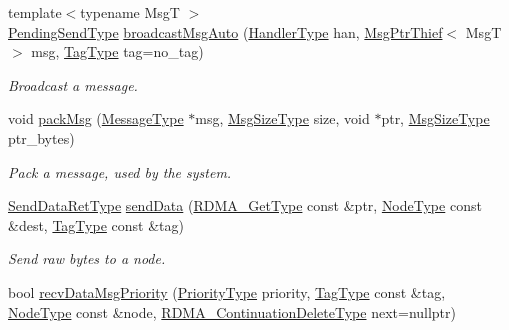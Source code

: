 \begin{DoxyCompactItemize}
{\footnotesize template$<$typename MsgT $>$ }\\\hyperlink{structvt_1_1messaging_1_1_active_messenger_a3626a6ca76d8ad4ec7c3b47a2c70d3a8}{Pending\+Send\+Type} \hyperlink{group__sendpayload_gab11ebaa792d7b87397773347626ad4f9}{broadcast\+Msg\+Auto} (\hyperlink{namespacevt_af64846b57dfcaf104da3ef6967917573}{Handler\+Type} han, \hyperlink{structvt_1_1messaging_1_1_msg_ptr_thief}{Msg\+Ptr\+Thief}$<$ MsgT $>$ msg, \hyperlink{namespacevt_a84ab281dae04a52a4b243d6bf62d0e52}{Tag\+Type} tag=no\+\_\+tag)
\begin{DoxyCompactList}\small\item\em Broadcast a message. \end{DoxyCompactList}\item 
void \hyperlink{structvt_1_1messaging_1_1_active_messenger_a9799bd2681540170faa04b424d3c849e}{pack\+Msg} (\hyperlink{structvt_1_1messaging_1_1_active_messenger_a720a2b1e7462d414b2a51d9fe005eca9}{Message\+Type} $\ast$msg, \hyperlink{namespacevt_abfa009d900299ac1df967b40ea8f2c8a}{Msg\+Size\+Type} size, void $\ast$ptr, \hyperlink{namespacevt_abfa009d900299ac1df967b40ea8f2c8a}{Msg\+Size\+Type} ptr\+\_\+bytes)
\begin{DoxyCompactList}\small\item\em Pack a message, used by the system. \end{DoxyCompactList}\item 
\hyperlink{structvt_1_1messaging_1_1_active_messenger_a839987e944b6b9c681bc56efbea1f220}{Send\+Data\+Ret\+Type} \hyperlink{structvt_1_1messaging_1_1_active_messenger_ac4385fea0c9cc860b5af24fea2f89a1d}{send\+Data} (\hyperlink{namespacevt_a1cab7f4860f65a49ad2c042d6240f288}{R\+D\+M\+A\+\_\+\+Get\+Type} const \&ptr, \hyperlink{namespacevt_a866da9d0efc19c0a1ce79e9e492f47e2}{Node\+Type} const \&dest, \hyperlink{namespacevt_a84ab281dae04a52a4b243d6bf62d0e52}{Tag\+Type} const \&tag)
\begin{DoxyCompactList}\small\item\em Send raw bytes to a node. \end{DoxyCompactList}\item 
bool \hyperlink{structvt_1_1messaging_1_1_active_messenger_ac4d614d118396fa51ba7f2634e2653fa}{recv\+Data\+Msg\+Priority} (\hyperlink{namespacevt_a86bff9f556eb761b27fc8600d006ac04}{Priority\+Type} priority, \hyperlink{namespacevt_a84ab281dae04a52a4b243d6bf62d0e52}{Tag\+Type} const \&tag, \hyperlink{namespacevt_a866da9d0efc19c0a1ce79e9e492f47e2}{Node\+Type} const \&node, \hyperlink{namespacevt_a4dfad0b5809d9812d60a0311a45ae0c2}{R\+D\+M\+A\+\_\+\+Continuation\+Delete\+Type} next=nullptr)

\end{DoxyCompactItemize}
